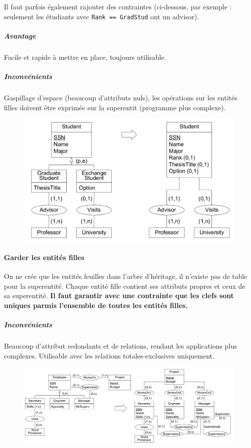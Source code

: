 \documentclass[a4paper]{article}
\begin{document}
Il faut parfois également rajouter des contraintes (ci-dessous, par exemple :
seulement les étudiants avec \texttt{Rank == GradStud} ont un advisor).
\subparagraph{Avantage}
Facile et rapide à mettre en place, toujours utilisable.
\subparagraph{Inconvénients}
Gaspillage d'espace (beaucoup d'attributs nuls), les opérations sur les entités
filles doivent être exprimée sur la superentit (programme plus complexe).
\begin{figure}[H]
    \center
    \includegraphics[width=.7\textwidth]{fig/er2rm-1.png}
\end{figure}

\paragraph{Garder les entités filles}
On ne crée que les entités feuilles dans l'arbre d'héritage, il n'existe pas de
table pour la superentité. Chaque entité fille contient ses attributs propres et
ceux de sa superentité. \textbf{Il faut garantir avec une contrainte que les
clefs sont uniques parmis l'ensemble de toutes les entités filles.}
\subparagraph{Inconvénients}
Beaucoup d'attribut redondants et de relations, rendant les applications plus complexes.
Utilisable avec les relations totales-exclusives uniquement.
\begin{figure}[H]
    \center
    \includegraphics[width=.9\textwidth]{fig/er2rm-2.png}
\end{figure}
\end{document}
